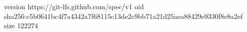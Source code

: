 version https://git-lfs.github.com/spec/v1
oid sha256:c5b0641bc4f7a4342a7f68115c13de2c9bb71a21d25aea88429e9330f8e8a2ef
size 122274
